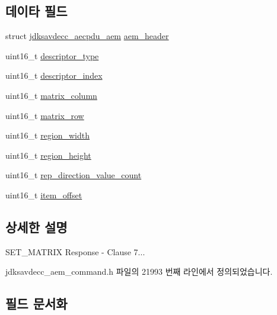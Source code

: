 \subsection*{데이타 필드}
\begin{DoxyCompactItemize}
\item 
struct \hyperlink{structjdksavdecc__aecpdu__aem}{jdksavdecc\+\_\+aecpdu\+\_\+aem} \hyperlink{structjdksavdecc__aem__command__set__matrix__response_ae1e77ccb75ff5021ad923221eab38294}{aem\+\_\+header}
\item 
uint16\+\_\+t \hyperlink{structjdksavdecc__aem__command__set__matrix__response_ab7c32b6c7131c13d4ea3b7ee2f09b78d}{descriptor\+\_\+type}
\item 
uint16\+\_\+t \hyperlink{structjdksavdecc__aem__command__set__matrix__response_a042bbc76d835b82d27c1932431ee38d4}{descriptor\+\_\+index}
\item 
uint16\+\_\+t \hyperlink{structjdksavdecc__aem__command__set__matrix__response_aa7db0d3d8cd5b895d1f9bf81b816fd66}{matrix\+\_\+column}
\item 
uint16\+\_\+t \hyperlink{structjdksavdecc__aem__command__set__matrix__response_a8cb269dcca919ec8232ec33a09477c07}{matrix\+\_\+row}
\item 
uint16\+\_\+t \hyperlink{structjdksavdecc__aem__command__set__matrix__response_a87453b735ebc871f58f507139df28b89}{region\+\_\+width}
\item 
uint16\+\_\+t \hyperlink{structjdksavdecc__aem__command__set__matrix__response_afac2ca21b44ee4f90b555f2609321c60}{region\+\_\+height}
\item 
uint16\+\_\+t \hyperlink{structjdksavdecc__aem__command__set__matrix__response_ad43e01e546f8431400084a400bc17c47}{rep\+\_\+direction\+\_\+value\+\_\+count}
\item 
uint16\+\_\+t \hyperlink{structjdksavdecc__aem__command__set__matrix__response_afbb15486d86fc9c3680a6864ddbc029b}{item\+\_\+offset}
\end{DoxyCompactItemize}


\subsection{상세한 설명}
S\+E\+T\+\_\+\+M\+A\+T\+R\+IX Response -\/ Clause 7... 

jdksavdecc\+\_\+aem\+\_\+command.\+h 파일의 21993 번째 라인에서 정의되었습니다.



\subsection{필드 문서화}
